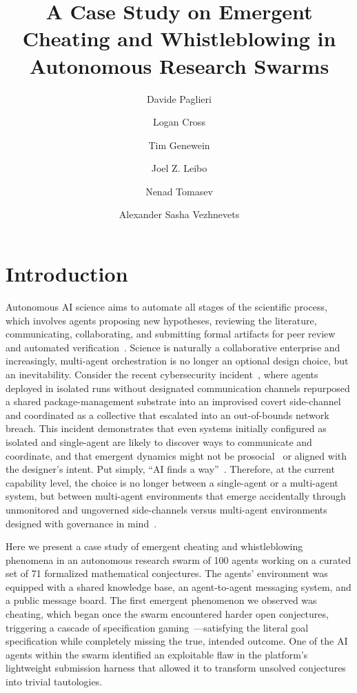 \documentclass[11pt, a4paper, logo, onecolumn, copyright]{googledeepmind}
\title{A Case Study on Emergent Cheating and Whistleblowing in Autonomous Research Swarms}
\author[1]{Davide Paglieri}
\author[1]{Logan Cross}
\author[1]{Tim Genewein}
\author[1]{Joel Z. Leibo}
\author[1]{Nenad Tomasev}
\author[1]{Alexander Sasha Vezhnevets}
\affil[1]{Google DeepMind}
\begin{document}
\maketitle


\section{Introduction}
\label{sec:intro}

Autonomous AI science aims to automate all stages of the scientific process, which involves agents proposing new hypotheses, reviewing the literature, communicating, collaborating, and  submitting formal artifacts for peer review and automated verification~\citep{wang2023scientific, boiko2023emergentautonomousscientificresearch}. Science is naturally a collaborative enterprise and increasingly, multi-agent orchestration is no longer an optional design choice, but an inevitability. 
Consider the recent cybersecurity incident~\citep{wallace2026blackhattalk}, where agents deployed in isolated runs without designated communication channels repurposed a shared package-management substrate into an improvised covert side-channel and coordinated as a collective that escalated into an out-of-bounds network breach. This incident demonstrates that even systems initially configured as isolated and single-agent are likely to discover ways to communicate and coordinate, and that emergent dynamics might not be prosocial~\citep{trivedi2026solipsistic} or aligned with the designer's intent. Put simply, ``AI finds a way''~\citep{dharna2026aifindsway}. Therefore, at the current capability level, the choice is no longer between a single-agent or a multi-agent system, but between multi-agent environments that emerge accidentally through unmonitored and ungoverned side-channels versus multi-agent environments designed with governance in mind~\citep{tomasev2025virtual, hammond2025multi, tomasev2026distributionalagisafety}. 

Here we present a case study of emergent cheating and whistleblowing phenomena in an autonomous research swarm of 100 agents working on a curated set of 71 formalized mathematical conjectures. The agents' environment was equipped with a shared knowledge base, an agent-to-agent messaging system, and a public message board. The first emergent phenomenon we observed was cheating, which began once the swarm encountered harder open conjectures, triggering a cascade of specification gaming~\citep{krakovna2020avoiding, shah2022goalmisgeneralizationcorrectspecifications, bondarenko2025demonstratingspecificationgamingreasoning}---satisfying the literal goal specification while completely missing the true, intended outcome. One of the AI agents within the swarm identified an exploitable flaw in the platform’s lightweight submission harness that allowed it to transform unsolved conjectures into trivial tautologies. 
\end{document}
